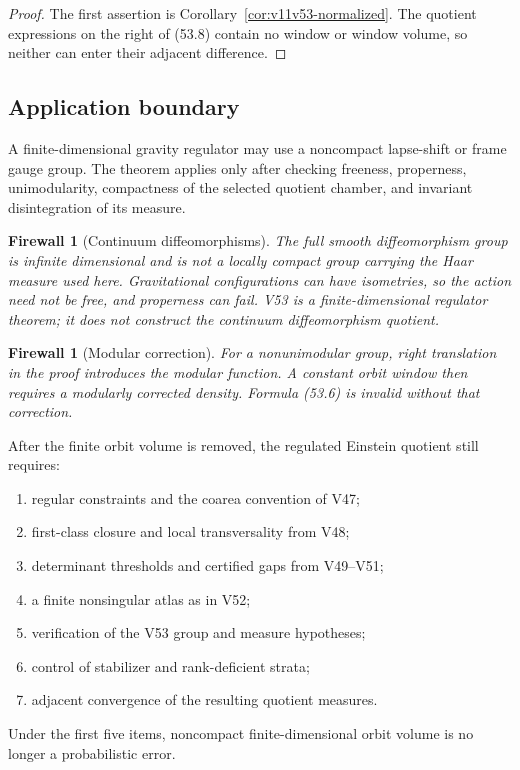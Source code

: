 \documentclass[11pt]{article}
\newtheorem{firewall}[theorem]{Firewall}
\begin{document}
\begin{proof}
The first assertion is
Corollary~\ref{cor:v11v53-normalized}.  The quotient expressions on the
right of (53.8) contain no window or window volume, so neither can
enter their adjacent difference.
\end{proof}

\subsection{Application boundary}

A finite-dimensional gravity regulator may use a noncompact
lapse-shift or frame gauge group.  The theorem applies only after
checking freeness, properness, unimodularity, compactness of the
selected quotient chamber, and invariant disintegration of its
measure.

\begin{firewall}[Continuum diffeomorphisms]
\label{fire:v11v53-continuum}
The full smooth diffeomorphism group is infinite dimensional and is not
a locally compact group carrying the Haar measure used here.
Gravitational configurations can have isometries, so the action need
not be free, and properness can fail.  V53 is a finite-dimensional
regulator theorem; it does not construct the continuum
diffeomorphism quotient.
\end{firewall}

\begin{firewall}[Modular correction]
\label{fire:v11v53-modular}
For a nonunimodular group, right translation in the proof introduces
the modular function.  A constant orbit window then requires a
modularly corrected density.  Formula (53.6) is invalid without that
correction.
\end{firewall}

\begin{ledger}
\label{led:v11v53-remaining}
After the finite orbit volume is removed, the regulated Einstein
quotient still requires:
\begin{enumerate}
\item regular constraints and the coarea convention of V47;
\item first-class closure and local transversality from V48;
\item determinant thresholds and certified gaps from V49--V51;
\item a finite nonsingular atlas as in V52;
\item verification of the V53 group and measure hypotheses;
\item control of stabilizer and rank-deficient strata;
\item adjacent convergence of the resulting quotient measures.
\end{enumerate}
Under the first five items, noncompact finite-dimensional orbit volume
is no longer a probabilistic error.
\end{ledger}
\end{document}
